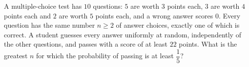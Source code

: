 A multiple-choice test has $10$ questions: $5$ are worth $3$ points each, $3$ are worth $4$ points each and $2$ are worth $5$ points each, and a wrong answer scores $0$. Every question has the same number $n\ge2$ of answer choices, exactly one of which is correct. A student guesses every answer uniformly at random, independently of the other questions, and passes with a score of at least $22$ points. What is the greatest $n$ for which the probability of passing is at least $\dfrac15$?
